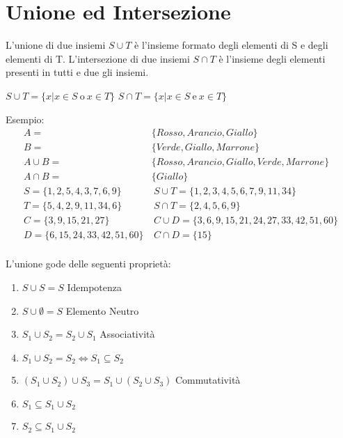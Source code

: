 \section{Unione ed Intersezione}
L'unione di due insiemi $S \cup T$ è l'insieme formato degli elementi di S e degli
elementi di T.\newline
L'intersezione di due insiemi $S \cap T$ è l'insieme degli elementi presenti in
tutti e due gli insiemi.

$S \cup T = \{x | x \in S \ \text{o} \ x \in T \} $ \newline
$S \cap T = \{x | x \in S \ \text{e} \ x \in T \} $

Esempio:
\begin{align*}
A = & \{Rosso,Arancio,Giallo \} \\
B = & \{Verde,Giallo,Marrone \} \\
A \cup B = & \{Rosso,Arancio,Giallo,Verde,Marrone \} \\
A \cap B = & \{Giallo \} \\
S = \{1,2,5,4,3,7,6,9\}  & \ S \cup T = \{1,2,3,4,5,6,7,9,11,34\} \\
T = \{5,4,2,9,11,34,6\}  & \ S \cap T = \{2,4,5,6,9\} \\
C = \{3,9,15,21,27\}  & \ C \cup D = \{3,6,9,15,21,24,27,33,42,51,60\} \\
D = \{6,15,24,33,42,51,60\} & \ C \cap D = \{15\}\\
\end{align*}

\begin{prop}
    L'unione gode delle seguenti proprietà:
\end{prop}
\begin{enumerate}
\item $S \cup S = S$ \quad Idempotenza
\item $S \cup \emptyset = S$ \quad Elemento Neutro
\item $S_1 \cup S_2 = S_2 \cup S_1$ \quad Associatività
\item $S_1 \cup S_2 = S_2 \iff S_1 \subseteq S_2$
\item $(S_1 \cup S_2) \cup S_3 = S_1 \cup (S_2 \cup S_3)$ \quad Commutatività
\item $S_1 \subseteq S_1 \cup S_2$
\item $S_2 \subseteq S_1 \cup S_2$
\end{enumerate}

